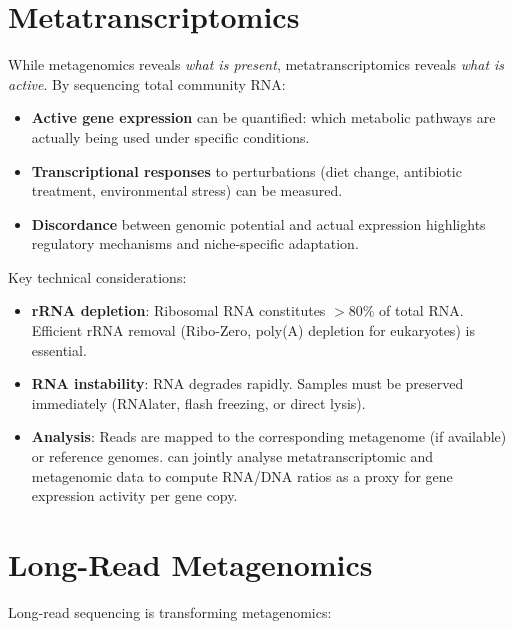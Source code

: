 \section{Metatranscriptomics}
\label{sec:metatranscriptomics}

While metagenomics reveals \emph{what is present}, metatranscriptomics reveals \emph{what is active}. By sequencing total community RNA:

\begin{itemize}[nosep]
  \item \textbf{Active gene expression} can be quantified: which metabolic pathways are actually being used under specific conditions.
  \item \textbf{Transcriptional responses} to perturbations (diet change, antibiotic treatment, environmental stress) can be measured.
  \item \textbf{Discordance} between genomic potential and actual expression highlights regulatory mechanisms and niche-specific adaptation.
\end{itemize}

Key technical considerations:
\begin{itemize}[nosep]
  \item \textbf{rRNA depletion}: Ribosomal RNA constitutes $>$80\% of total RNA. Efficient rRNA removal (Ribo-Zero, poly(A) depletion for eukaryotes) is essential.
  \item \textbf{RNA instability}: RNA degrades rapidly. Samples must be preserved immediately (RNAlater, flash freezing, or direct lysis).
  \item \textbf{Analysis}: Reads are mapped to the corresponding metagenome (if available) or reference genomes.  can jointly analyse metatranscriptomic and metagenomic data to compute RNA/DNA ratios as a proxy for gene expression activity per gene copy.
\end{itemize}

\section{Long-Read Metagenomics}
\label{sec:longread_meta}

Long-read sequencing is transforming metagenomics:

